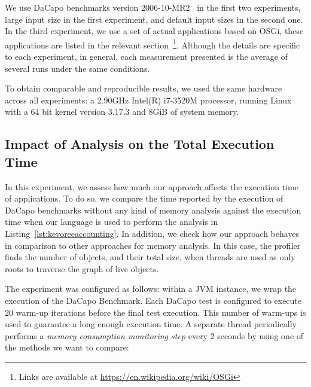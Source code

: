 We use DaCapo benchmarks version 2006-10-MR2~\cite{Blackburn:2006:DBJ:1167473.1167488} in the first two experiments, large input size in the first experiment, and default input sizes in the second one.
In the third experiment, we use a set of actual applications based on OSGi, these applications are listed in the relevant section~\footnote{Links are available at \url{https://en.wikipedia.org/wiki/OSGi}}.
Although the details are specific to each experiment, in general, each measurement presented is the average of several runs under the same conditions.

To obtain comparable and reproducible results, we used the same hardware across all experiments: a 2.90GHz Intel(R) i7-3520M processor, running Linux with a 64 bit kernel version 3.17.3 and 8GiB of system memory.

\subsection{Impact of Analysis on the Total Execution Time}

In this experiment, we assess how much our approach affects the execution time of applications.
To do so, we compare the time reported by the execution of DaCapo benchmarks without any kind of memory analysis against the execution time when our language is used to perform the analysis in Listing~\ref{lst:kevoreeaccounting}.
In addition, we check how our approach behaves in comparison to other approaches for memory analysis.
In this case, the profiler finds the number of objects, and their total size, when threads are used as only roots to traverse the graph of live objects.

The experiment was configured as follows: within a JVM instance, we wrap the execution of the DaCapo Benchmark.
Each DaCapo test is configured to execute 20 warm-up iterations before the final test execution.
This number of warm-ups is used to guarantee a long enough execution time.
A separate thread periodically performs a \textit{memory consumption monitoring step} every 2 seconds by using one of the methods we want to compare: 

